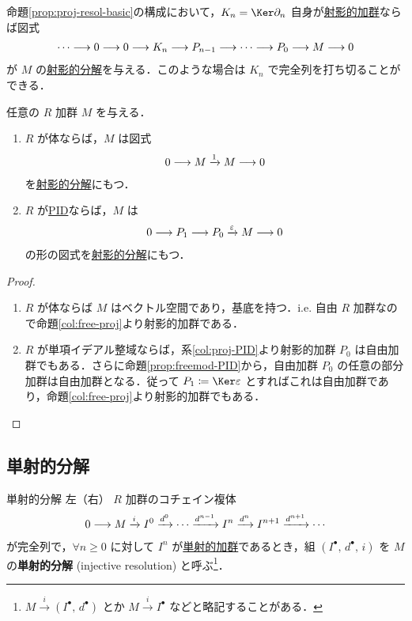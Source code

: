 \documentclass[algtopo_main]{subfiles}
\begin{document}
命題\ref{prop:proj-resol-basic}の構成において，$K_{n} = \Ker \partial_n$ 自身が\hyperref[def:proj-mod]{射影的加群}ならば図式
\begin{align}
    \cdots \longrightarrow 0 \longrightarrow 0 \longrightarrow K_n \longrightarrow P_{n-1} \longrightarrow \cdots \longrightarrow P_0 \longrightarrow M \longrightarrow 0
\end{align}
が $M$ の\hyperref[def:projective-resolution]{射影的分解}を与える．このような場合は $K_n$ で完全列を打ち切ることができる．

\begin{mytheo}[label=thm:proj-resol-PID]{}
    任意の $R$ 加群 $M$ を与える．
    \begin{enumerate}
        \item $R$ が体ならば，$M$ は図式
        \begin{align}
            0 \longrightarrow M \xrightarrow{1} M \longrightarrow 0
        \end{align}
        を\hyperref[def:projective-resolution]{射影的分解}にもつ．
        \item $R$ が\hyperref[def:PID]{PID}ならば，$M$ は
        \begin{align}
            0 \longrightarrow P_1 \longrightarrow P_0 \xrightarrow{\varepsilon} M \longrightarrow 0
        \end{align}
        の形の図式を\hyperref[def:projective-resolution]{射影的分解}にもつ．
    \end{enumerate}
\end{mytheo}

\begin{proof}
    \begin{enumerate}
        \item $R$ が体ならば $M$ はベクトル空間であり，基底を持つ．i.e. 自由 $R$ 加群なので命題\ref{col:free-proj}より射影的加群である．
        \item $R$ が単項イデアル整域ならば，系\ref{col:proj-PID}より射影的加群 $P_0$ は自由加群でもある．さらに命題\ref{prop:freemod-PID}から，自由加群 $P_0$ の任意の部分加群は自由加群となる．従って $P_1 \coloneqq \Ker \varepsilon$ とすればこれは自由加群であり，命題\ref{col:free-proj}より射影的加群でもある．
    \end{enumerate}
\end{proof}


\subsection{単射的分解}


\begin{mydef}[label=def:injective-resolution]{単射的分解}
    左（右） $R$ 加群のコチェイン複体
    \begin{align}
        0 \longrightarrow M \xrightarrow{i} I^0 \xrightarrow{d^0} \cdots \xrightarrow{d^{n-1}} I^n \xrightarrow{d^n} I^{n+1} \xrightarrow{d^{n+1}} \cdots
    \end{align}
    が完全列で，$\forall n \ge 0$ に対して $I^n$ が\hyperref[def:inj-mod]{単射的加群}であるとき，組 $(I^\bullet,\, d^\bullet,\, i)$ を $M$ の\textbf{単射的分解} (injective resolution) と呼ぶ\footnote{$M \xrightarrow{i}(I^\bullet,\, d^\bullet)$ とか $M \xrightarrow{i} I^\bullet$ などと略記することがある．}．
\end{mydef}
\end{document}

